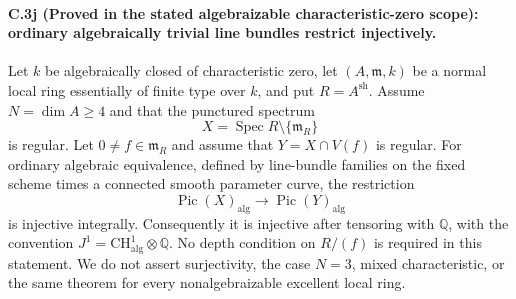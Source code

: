 \paragraph{C.3j (Proved in the stated algebraizable characteristic-zero scope): ordinary algebraically trivial line bundles restrict injectively.}
Let $k$ be algebraically closed of characteristic zero,
let $(A,\mathfrak m,k)$ be a normal local ring essentially
of finite type over $k$, and put $R=A^{\mathrm{sh}}$.
Assume $N=\dim A\ge4$ and that the punctured spectrum
\[
 X=\operatorname{Spec}R\setminus\{\mathfrak m_R\}
\]
is regular. Let $0\ne f\in\mathfrak m_R$ and assume
that $Y=X\cap V(f)$ is regular. For ordinary algebraic
equivalence, defined by line-bundle families on the
fixed scheme times a connected smooth parameter curve,
the restriction
\begin{equation}\label{eq:C3-ordinary-alg-injection}
 \operatorname{Pic}(X)_{\mathrm{alg}}
           \longrightarrow\operatorname{Pic}(Y)_{\mathrm{alg}}
\end{equation}
is injective integrally. Consequently it is injective
after tensoring with $\mathbb Q$, with the convention
$J^1=\mathrm{CH}^1_{\mathrm{alg}}\otimes\mathbb Q$.
No depth condition on $R/(f)$ is required in this
statement. We do not assert surjectivity, the case
$N=3$, mixed characteristic, or the same theorem for
every nonalgebraizable excellent local ring.

